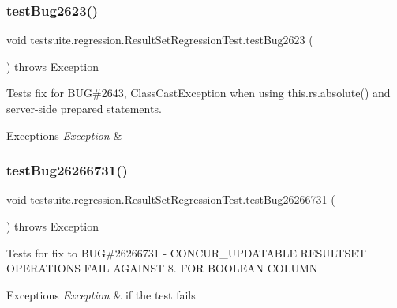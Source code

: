 \subsubsection{\texorpdfstring{test\+Bug2623()}{testBug2623()}}
{\footnotesize\ttfamily void testsuite.\+regression.\+Result\+Set\+Regression\+Test.\+test\+Bug2623 (\begin{DoxyParamCaption}{ }\end{DoxyParamCaption}) throws Exception}

Tests fix for B\+UG\#2643, Class\+Cast\+Exception when using this.\+rs.\+absolute() and server-\/side prepared statements.


\begin{DoxyExceptions}{Exceptions}
{\em Exception} & \\
\hline
\end{DoxyExceptions}
\mbox{\label{classtestsuite_1_1regression_1_1_result_set_regression_test_abdf1a89f884b877e115ff10663abd11a}} 
\subsubsection{\texorpdfstring{test\+Bug26266731()}{testBug26266731()}}
{\footnotesize\ttfamily void testsuite.\+regression.\+Result\+Set\+Regression\+Test.\+test\+Bug26266731 (\begin{DoxyParamCaption}{ }\end{DoxyParamCaption}) throws Exception}

Tests for fix to B\+UG\#26266731 -\/ C\+O\+N\+C\+U\+R\+\_\+\+U\+P\+D\+A\+T\+A\+B\+LE R\+E\+S\+U\+L\+T\+S\+ET O\+P\+E\+R\+A\+T\+I\+O\+NS F\+A\+IL A\+G\+A\+I\+N\+ST 8. F\+OR B\+O\+O\+L\+E\+AN C\+O\+L\+U\+MN


\begin{DoxyExceptions}{Exceptions}
{\em Exception} & if the test fails \\
\hline
\end{DoxyExceptions}
\mbox{\label{classtestsuite_1_1regression_1_1_result_set_regression_test_a32ba87707ddb894483b0813570ec5571}} 
